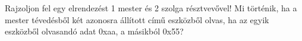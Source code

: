 \begin{example}

Rajzoljon fel egy elrendezést 1 mester és 2 szolga résztvevővel! Mi történik, ha a mester tévedésből két azonosra állított című eszközből olvas, ha az egyik eszközből olvasandó adat 0xaa, a másikból 0x55?

\tcbline
\vspace{1mm}

\solution

\end{example}